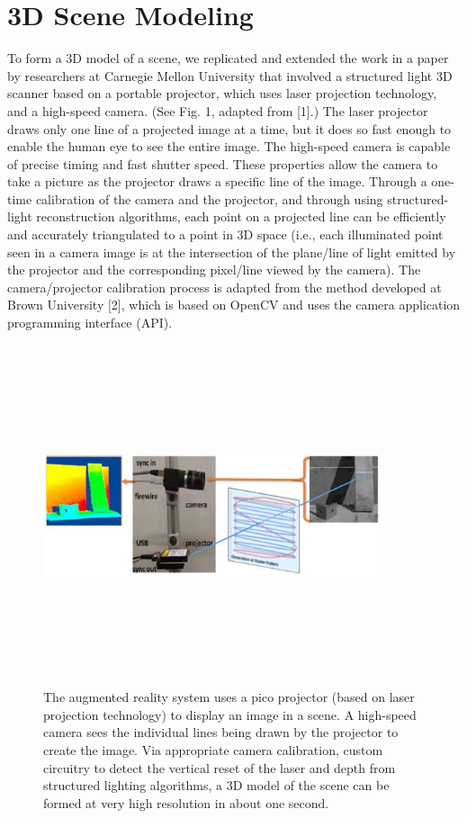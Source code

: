\documentclass{llncs}
\begin{document}
\section{3D Scene Modeling}
To form a 3D model of a scene, we replicated and extended the work in a paper by researchers at Carnegie Mellon University that involved a structured light 3D scanner based on a portable projector, which uses laser projection technology, and a high-speed camera. (See Fig. 1, adapted from [1].) The laser projector draws only one line of a projected image at a time, but it does so fast enough to enable the human eye to see the entire image. The high-speed camera is capable of precise timing and fast shutter speed. These properties allow the camera to take a picture as the projector draws a specific line of the image. Through a one-time calibration of the camera and the projector, and through using structured-light reconstruction algorithms, each point on a projected line can be efficiently and accurately triangulated to a point in 3D space (i.e., each illuminated point seen in a camera image is at the intersection of the plane/line of light emitted by the projector and the corresponding pixel/line viewed by the camera). The camera/projector calibration process is adapted from the method developed at Brown University [2], which is based on OpenCV and uses the camera application programming interface (API).
\begin{figure}
\centering
\includegraphics[width=10cm,height=10cm,keepaspectratio]{plan}
\caption{
The augmented reality system uses a pico projector (based on laser projection technology) to display an image in a scene. A high-speed camera sees the individual lines being drawn by the projector to create the image. Via appropriate camera calibration, custom circuitry to detect the vertical reset of the laser and depth from structured lighting algorithms, a 3D model of the scene can be formed at very high resolution in about one second.
}
\end{figure}
\end{document}
